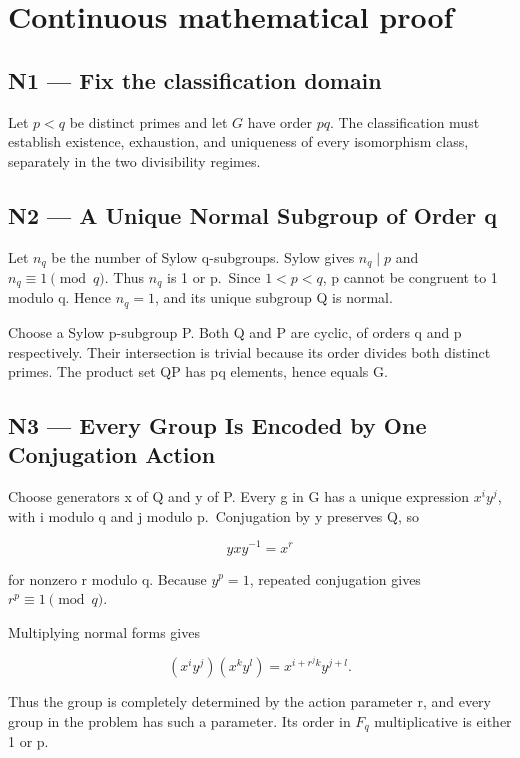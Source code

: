 \documentclass[preprint,12pt,aps,pra,showkeys,amsmath,amssymb,superscriptaddress,floatfix]{revtex4-2}
\theoremstyle{definition}
\theoremstyle{remark}
\begin{document}
\endgroup\clearpage\section{Continuous mathematical proof}\label{sec:proof}

\subsection{N1 --- Fix the classification
domain}\label{n1-fix-the-classification-domain}

Let \(p<q\) be distinct primes and let \(G\) have order \(pq\). The
classification must establish existence, exhaustion, and uniqueness of
every isomorphism class, separately in the two divisibility regimes.

\subsection{N2 --- A Unique Normal Subgroup of Order
q}\label{n2-a-unique-normal-subgroup-of-order-q}

Let \(n_q\) be the number of Sylow q-subgroups. Sylow gives
\(n_q\mid p\) and \(n_q\equiv1\pmod q\). Thus \(n_q\) is 1 or p.~Since
\(1<p<q\), p cannot be congruent to 1 modulo q. Hence \(n_q=1\), and its
unique subgroup Q is normal.

Choose a Sylow p-subgroup P. Both Q and P are cyclic, of orders q and p
respectively. Their intersection is trivial because its order divides
both distinct primes. The product set QP has pq elements, hence equals
G.

\subsection{N3 --- Every Group Is Encoded by One Conjugation
Action}\label{n3-every-group-is-encoded-by-one-conjugation-action}

Choose generators x of Q and y of P. Every g in G has a unique
expression \(x^iy^j\), with i modulo q and j modulo p.~Conjugation by y
preserves Q, so

\[yxy^{-1}=x^r\]

for nonzero r modulo q. Because \(y^p=1\), repeated conjugation gives
\(r^p\equiv1\pmod q\).

Multiplying normal forms gives

\[(x^iy^j)(x^ky^l)=x^{i+r^jk}y^{j+l}.\]

Thus the group is completely determined by the action parameter r, and
every group in the problem has such a parameter. Its order in \(F_q\)
multiplicative is either 1 or p.
\end{document}
